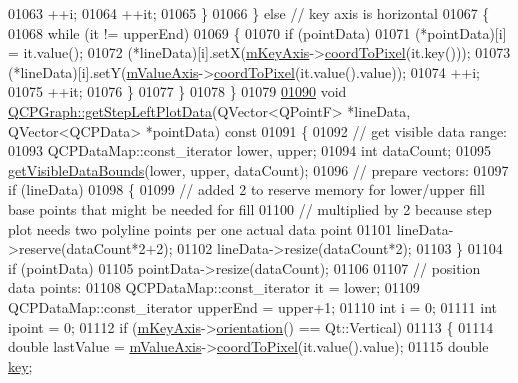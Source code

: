 \begin{DoxyCode}
01063       ++i;
01064       ++it;
01065     \}
01066   \} \textcolor{keywordflow}{else} \textcolor{comment}{// key axis is horizontal}
01067   \{
01068     \textcolor{keywordflow}{while} (it != upperEnd)
01069     \{
01070       \textcolor{keywordflow}{if} (pointData)
01071         (*pointData)[i] = it.value();
01072       (*lineData)[i].setX(\hyperlink{a00024_a692421b963472fa6e16156a74ba96832}{mKeyAxis}->\hyperlink{a00025_a985ae693b842fb0422b4390fe36d299a}{coordToPixel}(it.key()));
01073       (*lineData)[i].setY(\hyperlink{a00024_acfc46d619ab9598be33b64146da45822}{mValueAxis}->\hyperlink{a00025_a985ae693b842fb0422b4390fe36d299a}{coordToPixel}(it.value().value));
01074       ++i;
01075       ++it;
01076     \}
01077   \}
01078 \}
01079 
\hypertarget{a00115_source_l01090}{}\hyperlink{a00031_a6b7c14e04deed69b70d552dbe70c4d28}{01090} \textcolor{keywordtype}{void} \hyperlink{a00031_a6b7c14e04deed69b70d552dbe70c4d28}{QCPGraph::getStepLeftPlotData}(QVector<QPointF> *lineData, 
      QVector<QCPData> *pointData)\textcolor{keyword}{ const}
01091 \textcolor{keyword}{}\{
01092   \textcolor{comment}{// get visible data range:}
01093   QCPDataMap::const\_iterator lower, upper;
01094   \textcolor{keywordtype}{int} dataCount;
01095   \hyperlink{a00031_a8963c90087cf53b889b29dd59aa41aad}{getVisibleDataBounds}(lower, upper, dataCount);
01096   \textcolor{comment}{// prepare vectors:}
01097   \textcolor{keywordflow}{if} (lineData)
01098   \{
01099     \textcolor{comment}{// added 2 to reserve memory for lower/upper fill base points that might be needed for fill}
01100     \textcolor{comment}{// multiplied by 2 because step plot needs two polyline points per one actual data point}
01101     lineData->reserve(dataCount*2+2);
01102     lineData->resize(dataCount*2);
01103   \}
01104   \textcolor{keywordflow}{if} (pointData)
01105     pointData->resize(dataCount);
01106   
01107   \textcolor{comment}{// position data points:}
01108   QCPDataMap::const\_iterator it = lower;
01109   QCPDataMap::const\_iterator upperEnd = upper+1;
01110   \textcolor{keywordtype}{int} i = 0;
01111   \textcolor{keywordtype}{int} ipoint = 0;
01112   \textcolor{keywordflow}{if} (\hyperlink{a00024_a692421b963472fa6e16156a74ba96832}{mKeyAxis}->\hyperlink{a00025_a57483f2f60145ddc9e63f3af53959265}{orientation}() == Qt::Vertical)
01113   \{
01114     \textcolor{keywordtype}{double} lastValue = \hyperlink{a00024_acfc46d619ab9598be33b64146da45822}{mValueAxis}->\hyperlink{a00025_a985ae693b842fb0422b4390fe36d299a}{coordToPixel}(it.value().value);
01115     \textcolor{keywordtype}{double} \hyperlink{a00116_a94bb892c30911cd62cba0707a5395be4}{key};

\end{DoxyCode}
